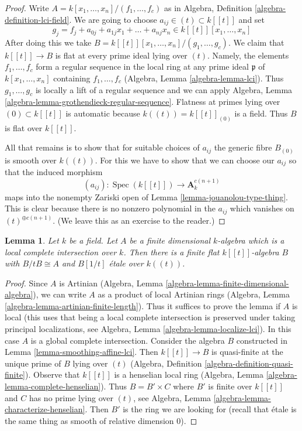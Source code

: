 \documentclass{stacks-project}
\theoremstyle{plain}
\newtheorem{lemma}[subsection]{Lemma}
\theoremstyle{definition}
\theoremstyle{remark}
\numberwithin{equation}{subsection}
\def\Spec{\mathop{\mathrm{Spec}}}
\begin{document}
\begin{proof}
Write $A = k[x_1, \ldots, x_n]/(f_1, \ldots, f_c)$ as in
Algebra, Definition \ref{algebra-definition-lci-field}.
We are going to choose
$a_{ij} \in (t) \subset k[[t]]$ and set
$$
g_j = f_j + a_{0j} + a_{1j}x_1 + \ldots + a_{nj}x_n \in
k[[t]][x_1, \ldots, x_n]
$$
After doing this we take
$B = k[[t]][x_1, \ldots, x_n]/(g_1, \ldots, g_c)$.
We claim that $k[[t]] \to B$ is flat at every prime ideal
lying over $(t)$. Namely, the elements $f_1, \ldots, f_c$
form a regular sequence in the local ring at any prime ideal
$\mathfrak p$ of $k[x_1, \ldots, x_n]$ containing $f_1, \ldots, f_c$
(Algebra, Lemma \ref{algebra-lemma-lci}). Thus $g_1, \ldots, g_c$
is locally a lift of a regular sequence and we can apply
Algebra, Lemma \ref{algebra-lemma-grothendieck-regular-sequence}.
Flatness at primes lying over $(0) \subset k[[t]]$ is automatic
because $k((t)) = k[[t]]_{(0)}$ is a field. Thus $B$ is flat
over $k[[t]]$.

\medskip\noindent
All that remains is to show that for suitable choices
of $a_{ij}$ the generic fibre $B_{(0)}$ is smooth over
$k((t))$. For this we have to show that we can choose
our $a_{ij}$ so that the induced morphism
$$
(a_{ij}) : \Spec(k[[t]]) \longrightarrow \mathbf{A}^{c(n + 1)}_k
$$
maps into the nonempty Zariski open of
Lemma \ref{lemma-jouanolou-type-thing}.
This is clear because there is no nonzero polynomial in the
$a_{ij}$ which vanishes on $(t)^{\oplus c(n + 1)}$.
(We leave this as an exercise to the reader.)
\end{proof}

\begin{lemma}
\label{lemma-smoothing-artinian-lci}
Let $k$ be a field. Let $A$ be a finite dimensional $k$-algebra
which is a local complete intersection over $k$. Then there is
a finite flat $k[[t]]$-algebra $B$ with $B/tB \cong A$
and $B[1/t]$ \'etale over $k((t))$.
\end{lemma}

\begin{proof}
Since $A$ is Artinian
(Algebra, Lemma \ref{algebra-lemma-finite-dimensional-algebra}),
we can write $A$ as a product of local Artinian rings
(Algebra, Lemma \ref{algebra-lemma-artinian-finite-length}).
Thus it suffices to prove the lemma if $A$ is local
(this uses that being a local complete intersection is
preserved under taking principal localizations, see
Algebra, Lemma \ref{algebra-lemma-localize-lci}).
In this case $A$ is a global complete intersection.
Consider the algebra $B$ constructed in
Lemma \ref{lemma-smoothing-affine-lci}.
Then $k[[t]] \to B$ is quasi-finite at the unique prime of $B$
lying over $(t)$ (Algebra, Definition \ref{algebra-definition-quasi-finite}).
Observe that $k[[t]]$ is a henselian local ring
(Algebra, Lemma \ref{algebra-lemma-complete-henselian}).
Thus $B = B' \times C$ where $B'$ is finite over $k[[t]]$
and $C$ has no prime lying over $(t)$, see
Algebra, Lemma \ref{algebra-lemma-characterize-henselian}.
Then $B'$ is the ring we are looking for
(recall that \'etale is the same thing as
smooth of relative dimension $0$).
\end{proof}
\end{document}
